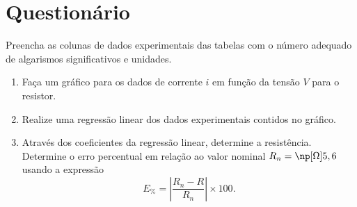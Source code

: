 \begin{fullwidth}
\noindent{}
\vspace{5mm}

\noindent{}

\noindent{}

\noindent{}

\noindent{}

\noindent{}
\end{fullwidth}

\vspace{5mm}

\section{Questionário}

\begin{question}[type={exam}]{2}
Preencha as colunas de dados experimentais das tabelas com o número adequado de algarismos significativos e unidades.
\end{question}

\begin{question}[type={exam}]{3}
\begin{enumerate}[label=\roman*.]
\item Faça um gráfico para os dados de corrente $i$ em função da tensão $V$ para o resistor.
\item Realize uma regressão linear dos dados experimentais contidos no gráfico.
\item Através dos coeficientes da regressão linear, determine a resistência. Determine o erro percentual em relação ao valor nominal $R_n = \np[\si{\ohm}]{5,6}$ usando a expressão
    \begin{equation*}
        E_\% = \left|\frac{R_n - R}{R_n}\right|\times 100.
    \end{equation*}
\end{enumerate}
\end{question}

